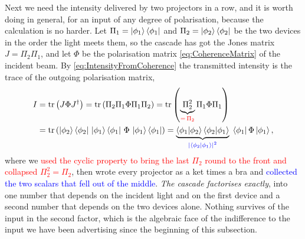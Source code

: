             Next we need the intensity delivered by two projectors in a row, and it is worth doing in general, for an input of any degree of polarisation, because the calculation is no harder. Let $\Pi_1=\ket{\phi_1}\bra{\phi_1}$ and $\Pi_2=\ket{\phi_2}\bra{\phi_2}$ be the two devices in the order the light meets them, so the cascade has got the Jones matrix $J=\Pi_2\Pi_1$, and let $\Phi$ be the polarisation matrix \ref{eq:CoherenceMatrix} of the incident beam. By \ref{eq:IntensityFromCoherence} the transmitted intensity is the trace of the outgoing polarisation matrix,
            \begin{align}
                I &= \text{tr}\left(J\Phi J^{\dagger}\right) = \text{tr}\left(\Pi_2\Pi_1\Phi\Pi_1\Pi_2\right) = \text{tr}\left(\underbrace{\Pi_2^2}_{\textcolor{red}{=\,\Pi_2}}\Pi_1\Phi\Pi_1\right) \nonumber \\
                &= \text{tr}\left(\ket{\phi_2}\bra{\phi_2}\,\ket{\phi_1}\bra{\phi_1}\,\Phi\,\ket{\phi_1}\bra{\phi_1}\right) = \underbrace{\braket{\phi_1|\phi_2}\braket{\phi_2|\phi_1}}_{\textcolor{blue}{\left|\braket{\phi_2|\phi_1}\right|^2}}\;\bra{\phi_1}\Phi\ket{\phi_1} , \label{eq:CascadeFactorisation}
            \end{align}
            where we \textcolor{red}{used the cyclic property to bring the last $\Pi_2$ round to the front and collapsed $\Pi_2^2=\Pi_2$}, then wrote every projector as a ket times a bra and \textcolor{blue}{collected the two scalars that fell out of the middle}. \emph{The cascade factorises exactly}, into one number that depends on the incident light and on the first device and a second number that depends on the two devices alone. Nothing survives of the input in the second factor, which is the algebraic face of the indifference to the input we have been advertising since the beginning of this subsection.

